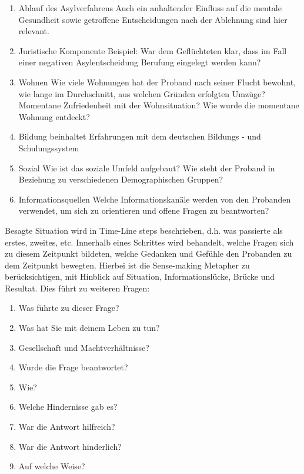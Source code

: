 \begin{enumerate}
    \item Ablauf des Asylverfahrens\newline
    Auch ein anhaltender Einfluss auf die mentale Gesundheit sowie getroffene Entscheidungen nach der Ablehnung sind hier relevant.
    \item Juristische Komponente \newline
    Beispiel: War dem Gefl\"uchteten klar, dass im Fall einer negativen Asylentscheidung Berufung eingelegt werden kann?
    \item Wohnen \newline
    Wie viele Wohnungen hat der Proband nach seiner Flucht bewohnt, wie lange im Durchschnitt, aus welchen Gr\"unden erfolgten Umz\"uge? Momentane Zufriedenheit mit der Wohnsituation? Wie wurde die momentane Wohnung entdeckt?
    \item Bildung \newline
    beinhaltet Erfahrungen mit dem deutschen Bildungs - und Schulungssystem
    \item Sozial\newline
    Wie ist das soziale Umfeld aufgebaut? Wie steht der Proband in Beziehung zu verschiedenen Demographischen Gruppen?
    \item Informationsquellen\newline
    Welche Informationskan\"ale werden von den Probanden verwendet, um sich zu orientieren und offene Fragen zu beantworten?
\end{enumerate}
Besagte Situation wird in Time-Line steps beschrieben, d.h. was passierte als erstes, zweites, etc. Innerhalb eines Schrittes wird behandelt, welche Fragen sich zu diesem Zeitpunkt bildeten, welche Gedanken und Gef\"uhle den Probanden zu dem Zeitpunkt bewegten.\newline
Hierbei ist die Sense-making Metapher zu ber\"ucksichtigen, mit Hinblick auf Situation, Informationsl\"ucke, Br\"ucke und Resultat.\cite{dervin2003sense}\newline
Dies f\"uhrt zu weiteren Fragen:\newline
\begin{enumerate}
    \item Was f\"uhrte zu dieser Frage?
    \item Was hat Sie mit deinem Leben zu tun?
    \item Gesellschaft und Machtverh\"altnisse?
    \item Wurde die Frage beantwortet?
    \item Wie?
    \item Welche Hindernisse gab es?
    \item War die Antwort hilfreich?
    \item War die Antwort hinderlich?
    \item Auf welche Weise?
\end{enumerate}
